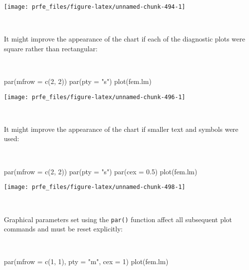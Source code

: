 \documentclass[
  12pt,
  a4paper]{book}
\newenvironment{Shaded}{\begin{snugshade}}{\end{snugshade}}
\newcommand{\AttributeTok}[1]{\textcolor[rgb]{0.77,0.63,0.00}{#1}}
\newcommand{\DecValTok}[1]{\textcolor[rgb]{0.00,0.00,0.81}{#1}}
\newcommand{\FloatTok}[1]{\textcolor[rgb]{0.00,0.00,0.81}{#1}}
\newcommand{\FunctionTok}[1]{\textcolor[rgb]{0.00,0.00,0.00}{#1}}
\newcommand{\NormalTok}[1]{#1}
\newcommand{\StringTok}[1]{\textcolor[rgb]{0.31,0.60,0.02}{#1}}
\begin{document}
\begin{center}\texttt{[image: prfe\_files/figure-latex/unnamed-chunk-494-1]} \end{center}

~

It might improve the appearance of the chart if each of the diagnostic plots were square rather than rectangular:

~

\begin{Shaded}
\begin{Highlighting}[]
\FunctionTok{par}\NormalTok{(}\AttributeTok{mfrow =} \FunctionTok{c}\NormalTok{(}\DecValTok{2}\NormalTok{, }\DecValTok{2}\NormalTok{))}
\FunctionTok{par}\NormalTok{(}\AttributeTok{pty =} \StringTok{"s"}\NormalTok{)}
\FunctionTok{plot}\NormalTok{(fem.lm)}
\end{Highlighting}
\end{Shaded}

\newpage

\begin{center}\texttt{[image: prfe\_files/figure-latex/unnamed-chunk-496-1]} \end{center}

~

It might improve the appearance of the chart if smaller text and symbols were used:

~

\begin{Shaded}
\begin{Highlighting}[]
\FunctionTok{par}\NormalTok{(}\AttributeTok{mfrow =} \FunctionTok{c}\NormalTok{(}\DecValTok{2}\NormalTok{, }\DecValTok{2}\NormalTok{))}
\FunctionTok{par}\NormalTok{(}\AttributeTok{pty =} \StringTok{"s"}\NormalTok{)}
\FunctionTok{par}\NormalTok{(}\AttributeTok{cex =} \FloatTok{0.5}\NormalTok{)}
\FunctionTok{plot}\NormalTok{(fem.lm)}
\end{Highlighting}
\end{Shaded}

\newpage

\begin{center}\texttt{[image: prfe\_files/figure-latex/unnamed-chunk-498-1]} \end{center}

~

Graphical parameters set using the \texttt{par()} function affect all subsequent plot commands and must be reset explicitly:

~

\begin{Shaded}
\begin{Highlighting}[]
\FunctionTok{par}\NormalTok{(}\AttributeTok{mfrow =} \FunctionTok{c}\NormalTok{(}\DecValTok{1}\NormalTok{, }\DecValTok{1}\NormalTok{), }\AttributeTok{pty =} \StringTok{"m"}\NormalTok{, }\AttributeTok{cex =} \DecValTok{1}\NormalTok{)}
\FunctionTok{plot}\NormalTok{(fem.lm)}
\end{Highlighting}
\end{Shaded}
\end{document}
